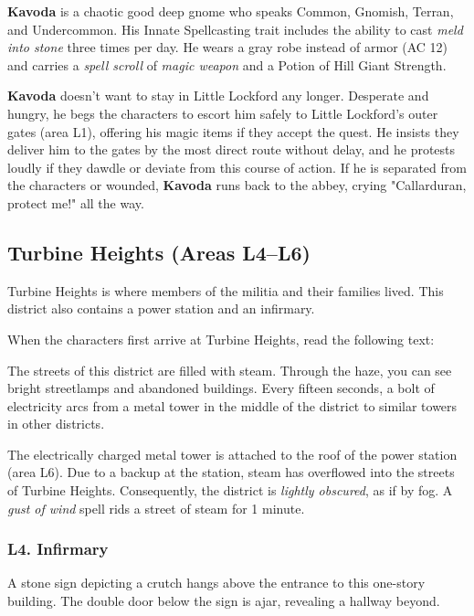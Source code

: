 \documentclass[10pt,a4paper,twoside,bg=print,twocolumn,openany,nodeprecatedcode]{dndbook}
\begin{document}
\textbf{Kavoda} is a chaotic good deep gnome who speaks Common, Gnomish, Terran, and Undercommon. His Innate Spellcasting trait includes the ability to cast \textit{meld into stone} three times per day. He wears a gray robe instead of armor (AC 12) and carries a \textit{spell scroll} of \textit{magic weapon} and a Potion of Hill Giant Strength.

\textbf{Kavoda} doesn't want to stay in Little Lockford any longer. Desperate and hungry, he begs the characters to escort him safely to Little Lockford's outer gates (area L1), offering his magic items if they accept the quest. He insists they deliver him to the gates by the most direct route without delay, and he protests loudly if they dawdle or deviate from this course of action. If he is separated from the characters or wounded, \textbf{Kavoda} runs back to the abbey, crying "Callarduran, protect me!" all the way.

\subsection{Turbine Heights (Areas L4–L6)}
Turbine Heights is where members of the militia and their families lived. This district also contains a power station and an infirmary.

When the characters first arrive at Turbine Heights, read the following text:

\begin{DndReadAloud}{}
The streets of this district are filled with steam. Through the haze, you can see bright streetlamps and abandoned buildings. Every fifteen seconds, a bolt of electricity arcs from a metal tower in the middle of the district to similar towers in other districts.

\end{DndReadAloud}

The electrically charged metal tower is attached to the roof of the power station (area L6). Due to a backup at the station, steam has overflowed into the streets of Turbine Heights. Consequently, the district is \textit{lightly obscured}, as if by fog. A \textit{gust of wind} spell rids a street of steam for 1 minute.

\subsubsection{L4. Infirmary}
\begin{DndReadAloud}{}
A stone sign depicting a crutch hangs above the entrance to this one-story building. The double door below the sign is ajar, revealing a hallway beyond.

\end{DndReadAloud}
\end{document}
